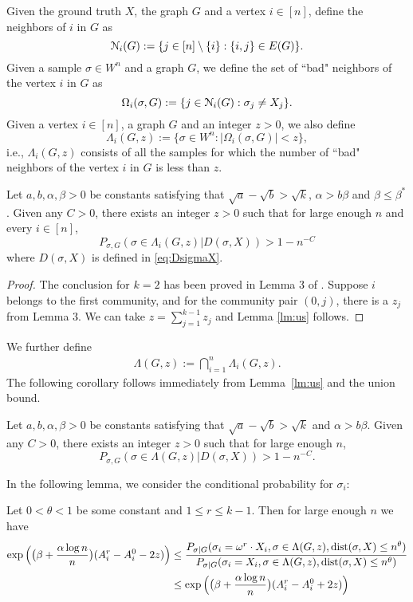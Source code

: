 \documentclass{article}
\begin{document}
Given the ground truth $X$, the graph $G$ and a vertex $i\in[n]$, define the neighbors of $i$ in $G$ as 
\begin{equation} \label{eq:ngbi}
\mathcal{N}_i(G) := \{j\in[n]\setminus\{i\}:
\{i,j\}\in E(G) \} .
\end{equation}
Given a sample $\sigma\in W^n$ and a graph $G$,  we define the set of ``bad" neighbors of the vertex $i$ in $G$ as
$$
\Omega_i(\sigma,G):=\{j\in \mathcal{N}_i(G): 
\sigma_j \neq X_j \} .
$$
Given a vertex $i\in[n]$, a graph $G$ and an integer $z>0$, we also define
$$
\Lambda_i(G, z):=\{ \sigma\in W^n: |\Omega_i(\sigma,G)| < z \} ,
$$
i.e., $\Lambda_i(G, z)$ consists of all the samples for which the number of ``bad" neighbors of the vertex $i$ in $G$ is less than $z$.

\begin{lemma} \label{lm:us}
	Let $a,b,\alpha,\beta> 0$ be constants satisfying that $\sqrt{a}-\sqrt{b} > \sqrt{k}$, $\alpha>b\beta$ and $\beta\le \beta^\ast$.
	Given any $C>0$, there exists an integer $z>0$ such that for large enough $n$ and every $i\in[n]$, 
	\begin{equation} \label{eq:zr}
	P_{\sigma, G} (\sigma\in \Lambda_i(G, z)
	| D(\sigma, X)
	)
	> 1 - n^{-C}
	\end{equation}
	where $D(\sigma, X)$ is defined in \eqref{eq:DsigmaX}.
\end{lemma}
\begin{proof}
	The conclusion for $k=2$ has been proved in Lemma 3 of \cite{ye2020exact}. Suppose $i$ belongs to the first community, and for the community
	pair $(0, j)$, there is a $z_{j}$ from Lemma 3.
	We can take $z = \sum_{j=1}^{k-1} z_j$ and Lemma \ref{lm:us} follows.
\end{proof}
We further define 
\begin{align*}
\Lambda(G, z) :=
\bigcap_{i=1}^n
\Lambda_i(G, z) .
\end{align*}
The following corollary follows immediately from Lemma~\ref{lm:us} and the union bound.
\begin{corollary} \label{cr:1}
	Let $a,b,\alpha,\beta> 0$ be constants satisfying that $\sqrt{a}-\sqrt{b} > \sqrt{k}$ and $\alpha>b\beta$.
	Given any $C>0$, there exists an integer $z>0$ such that for large enough $n$, 
	$$
	P_{\sigma, G} (\sigma\in \Lambda(G, z)
	| D(\sigma, X) )
	> 1 - n^{-C} .
	$$
\end{corollary}

In the following lemma, we consider the conditional probability for $\sigma_i$:
\begin{lemma} \label{lm:et}
	Let $0<\theta<1$ be some constant and $1\leq r \leq k-1$. Then for large enough $n$ we have
	\begin{align*}
	\exp\Big(\big(\beta+\frac{\alpha\log n}{n} \big) (A^r_i-A^0_i - 2z) \Big) & \le 
	\frac{P_{\sigma|G}(\sigma_i= \omega^r \cdot X_i, \sigma\in \Lambda(G,z) ,\operatorname{dist}(\sigma, X) \le n^{\theta} ) } 
	{ P_{\sigma|G}(\sigma_i=X_i, \sigma\in \Lambda(G,z) ,\operatorname{dist}(\sigma, X) \le n^{\theta} ) } \\
	& \le \exp\Big(\big(\beta+\frac{\alpha\log n}{n} \big) (A^r_i-A^0_i + 2z) \Big)
	\end{align*}
\end{lemma}
\end{document}
